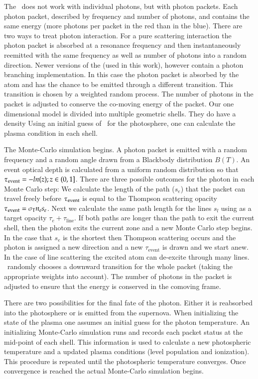 The \mlc\ does not work with individual photons, but with photon packets. Each photon packet, described by  frequency and number of photons, and contains the same energy (more photons per packet in the red than in the blue). There are two ways to treat photon interaction. For a pure scattering interaction the photon packet is absorbed at a resonance frequency and then instantaneously reemitted with the same frequency as well as number of photons into a random direction. Newer versions of the \mlc (used in this work), however contain a photon branching implementation. In this case the photon packet is absorbed by the atom and has the chance to be emitted through a different transition. This transition is chosen by a weighted random process. The number of photons in the packet is adjusted to conserve the co-moving energy of the packet. Our one dimensional model is divided into multiple geometric shells.  They do have a density  Using an initial guess of \teff\ for the photosphere, one can calculate the plasma condition in each shell.

The Monte-Carlo simulation begins. A photon packet is emitted with a random frequency and a random angle drawn from a Blackbody distribution $B(T)$.  An event optical depth is calculated from a uniform random distribution so that $\tau_{\rm event}=-ln(z); z \in (0,1]$.  There are three possible outcomes for the photon in each Monte Carlo step: We calculate the length of the path ($s_e$) that the packet can travel freely before $\tau_{\rm event}$ is equal to the Thompson scattering opacity $\tau_{\rm event} = \sigma_\textrm{T} n_e s_e$. Next we calculate the same path length for the lines $s_l$ using as a target opacity $\tau_e + \tau_\textrm{line}$. If both paths are longer than the path to exit the current shell, then the photon exits the current zone and a new Monte Carlo step begins. In the case that $s_e$ is the shortest then Thompson scattering occurs and the photon is assigned a new direction and a new $\tau_\textrm{event}$ is drawn and we start anew. In the case of line scattering the excited atom can de-excite through many lines. \mlc\ randomly chooses a downward transition for the whole packet (taking the appropriate weights into account). The number of photons in the packet is adjusted to ensure that the energy is conserved in the comoving frame. 

There are two possibilities for the final fate of the photon. Either it is reabsorbed into the photosphere or is emitted from the supernova. When initializing the state of the plasma one assumes an initial guess for the photon temperature. An initializing Monte-Carlo simulation runs and records each packet status at the mid-point of each shell. This information is used to calculate a new photospheric temperature and a updated plasma conditions (level population and ionization). This procedure is repeated until the photospheric temperature converges. Once convergence is reached the actual Monte-Carlo simulation begins. 

